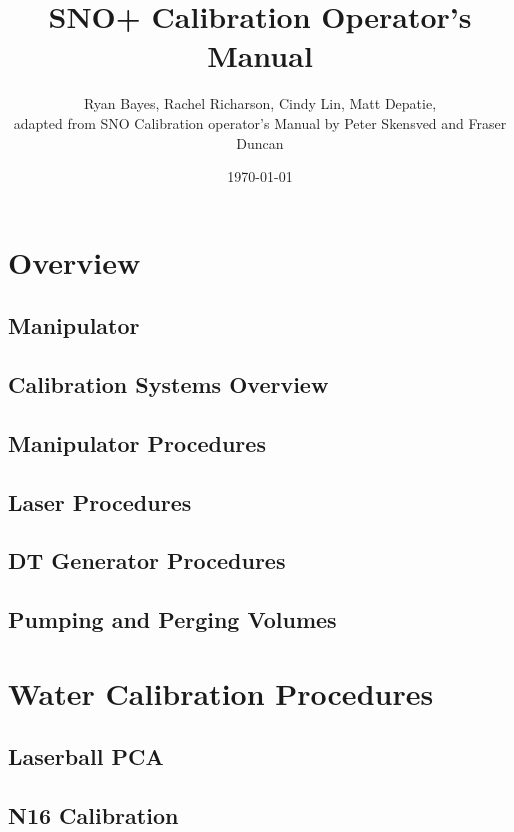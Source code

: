 \documentclass[10pt]{report}
\title{SNO+ Calibration Operator's Manual}
\author{Ryan Bayes, Rachel Richarson, Cindy Lin, Matt Depatie, \\ adapted from SNO Calibration operator's Manual by Peter Skensved and Fraser Duncan}
\date{\today}
\begin{document}
\maketitle
\pagebreak
\part{Overview}

\chapter{Manipulator}

\chapter{Calibration Systems Overview}








\chapter{Manipulator Procedures}

\chapter{Laser Procedures}

\chapter{DT Generator Procedures}


\chapter{Pumping and Perging Volumes}
\part{Water Calibration Procedures}
\chapter{Laserball PCA}

\chapter{N16 Calibration}

\end{document}
